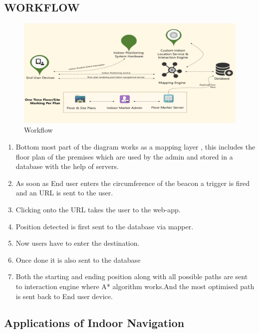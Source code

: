 ﻿\documentclass[a4paper, 12pt]{article}
\begin{document}
\subsection{WORKFLOW}
\begin{figure}[h!]
    \centering
    \includegraphics[width = 6in]{2.png}
    \caption{Workflow}
    \label{fig: blockbit}
\end{figure}
\begin{enumerate}
	\item 	Bottom most part of the diagram works as a mapping layer , this includes the floor plan of the premises which are used by the admin and stored in a database with the help of servers.
	\item 	As soon as End user enters the circumference of the beacon a trigger is fired and an URL is sent to the user.
	\item 	Clicking onto the URL takes the user to the web-app.
	\item 	Position detected is first sent to the database via mapper.
	\item 	Now users have to enter the destination.
	\item 	Once done it is also sent to the database 
	\item 	Both the starting and ending position along with all possible paths are sent to interaction engine where A* algorithm works.And the most optimised path is sent back to End user device.
\end{enumerate}

\newpage
\begin{center}
	\section{Applications of Indoor Navigation}
\end{center}
\end{document}
